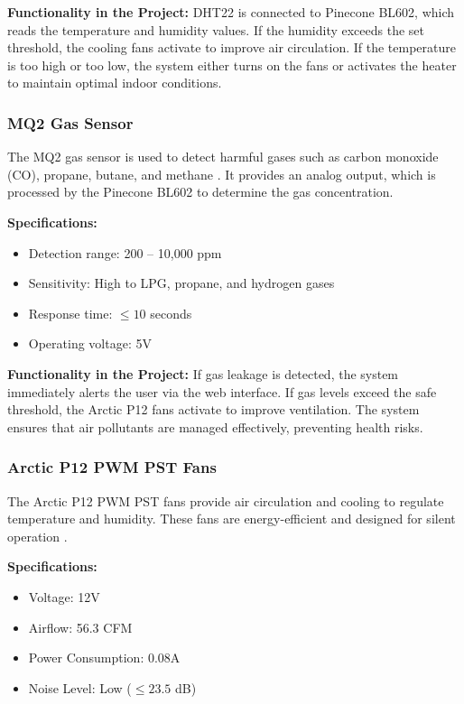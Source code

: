 \documentclass[a4paper]{scrartcl}
\begin{document}
\textbf{Functionality in the Project:}
DHT22 is connected to Pinecone BL602, which reads the temperature and humidity values. If the humidity exceeds the set threshold, the cooling fans activate to improve air circulation. If the temperature is too high or too low, the system either turns on the fans or activates the heater to maintain optimal indoor conditions.

\subsubsection{MQ2 Gas Sensor}
The MQ2 gas sensor is used to detect harmful gases such as carbon monoxide (CO), propane, butane, and methane \cite{r12}. It provides an analog output, which is processed by the Pinecone BL602 to determine the gas concentration.

\textbf{Specifications:}
\begin{itemize}
    \item Detection range: 200 – 10,000 ppm
    \item Sensitivity: High to LPG, propane, and hydrogen gases
    \item Response time: \(\leq 10 \) seconds
    \item Operating voltage: 5V
\end{itemize}

\textbf{Functionality in the Project:}
If gas leakage is detected, the system immediately alerts the user via the web interface. If gas levels exceed the safe threshold, the Arctic P12 fans activate to improve ventilation. The system ensures that air pollutants are managed effectively, preventing health risks.

\subsubsection{Arctic P12 PWM PST Fans}
The Arctic P12 PWM PST fans provide air circulation and cooling to regulate temperature and humidity. These fans are energy-efficient and designed for silent operation \cite{r8}.

\textbf{Specifications:}
\begin{itemize}
    \item Voltage: 12V
    \item Airflow: 56.3 CFM
    \item Power Consumption: 0.08A
    \item Noise Level: Low (\(\leq 23.5\) dB)
\end{itemize}
\end{document}
